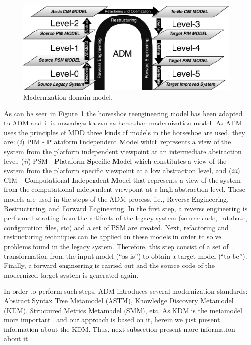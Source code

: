 \documentclass[a4paper,twoside]{article}
\begin{document}
\begin{figure}[!ht]
\centering
  \includegraphics[scale=0.37]{figuras/Fonte_horse_shoe}
\caption{Modernization domain model.}
\label{horseshoe}
\end{figure}

As can be seen in Figure~\ref{horseshoe} the horseshoe reengineering model has been adapted to ADM and it is nowadays known as horseshoe modernization model. As ADM uses the principles of MDD three kinds of models in the horseshoe are used, they are: (\textit{i}) PIM - \textbf{P}lataform \textbf{I}ndependent \textbf{M}odel which represents a view of the system from the platform independent viewpoint at an intermediate abstraction level, (\textit{ii}) PSM - \textbf{P}lataform \textbf{S}pecific \textbf{M}odel which constitutes a view of the system from the platform specific viewpoint at a low abstraction level, and (\textit{iii}) CIM - \textbf{C}omputational \textbf{I}ndependent \textbf{M}odel that represents a view of the system from the computational independent viewpoint at a high abstraction level. These models are used in the steps of the ADM process, i.e., Reverse Engineering, Restructuring, and Forward Engineering. In the first step, a reverse engineering is performed starting from the artifacts of the legacy system (source code, database, configuration files, etc) and a set of PSM are created. Next, refactoring and restructuring techniques can be applied on these models in order to solve problems found in the legacy system. Therefore, this step consist of a set of transformation from the input model (``as-is'') to obtain a target model (``to-be''). Finally, a forward engineering is carried out and the source code of the modernized target system is generated again. 


In order to perform such steps, ADM introduces several modernization standards: Abstract Syntax Tree Metamodel (ASTM), Knowledge Discovery Metamodel (KDM), Structured Metrics Metamodel (SMM), etc. As KDM is the metamodel more important~\cite{OMG} and our approach is based on it, herein we just present information about the KDM. Thus, next subsection present more information about it.
\end{document}
